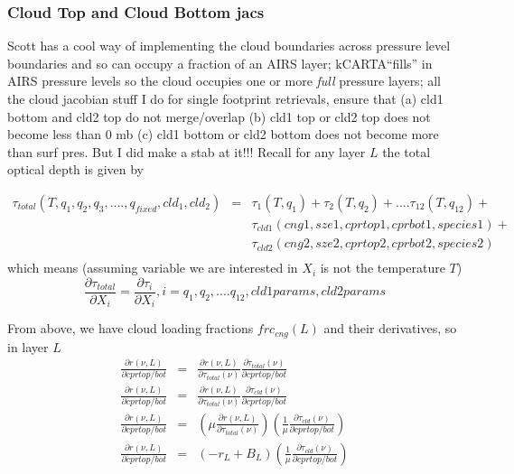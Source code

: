 \documentclass[11pt]{article}
\newcommand{\kc}{\textsf{kCARTA}\xspace}
\begin{document}
\subsubsection{Cloud Top and Cloud Bottom jacs}

Scott has a cool way of implementing the cloud
boundaries across pressure level boundaries and so can occupy a
fraction of an AIRS layer; \kc ``fills'' in AIRS pressure levels so
the cloud occupies one or more \textit{full} pressure layers; all the
cloud jacobian stuff I do for single footprint retrievals, ensure that
(a) cld1 bottom and cld2 top do not merge/overlap (b) cld1 top or cld2 top
does not become less than 0 mb (c) cld1 bottom or cld2 bottom does not
become more than surf pres. But I did make a stab at it!!! Recall for any layer $L$ the total optical depth is given by 

\begin{eqnarray*}
\tau_{total}(T,q_1,q_2,q_3,....,q_{fixed},cld_1,cld_2) & = & \tau_1(T,q_1) + \tau_2(T,q_2) + .... \tau_{12}(T,q_{12}) + \\
                                                       &   & \tau_{cld1}(cng1,sze1,cprtop1,cprbot1,species1) + \\
                                                       &   & \tau_{cld2}(cng2,sze2,cprtop2,cprbot2,species2) \\
\end{eqnarray*}
which means (assuming variable we are interested in $X_i$ is not the temperature $T$)
\[ 
\frac{\partial \tau_{total}}{\partial X_i} = \frac{\partial \tau_{i}}{\partial X_i}, i=q_1,q_2,....q_{12},cld1 params, cld2 params
\]

From above, we have cloud loading fractions $frc_{cng}(L)$ and their derivatives, so in layer $L$
\begin{eqnarray*}
\frac{\partial r(\nu,L)}{\partial cprtop/bot}  & = &  \frac{\partial r(\nu,L)}{\partial \tau_{total}(\nu)} \frac{\partial \tau_{total}(\nu)}{\partial cprtop/bot} \\
\frac{\partial r(\nu,L)}{\partial cprtop/bot}  & = &  \frac{\partial r(\nu,L)}{\partial \tau_{total}(\nu)} \frac{\partial \tau_{cld}(\nu)}{\partial cprtop/bot} \\
\frac{\partial r(\nu,L)}{\partial cprtop/bot}  & = &  \left( \mu \frac{\partial r(\nu,L)}{\partial \tau_{total}(\nu)} \right) \left( \frac{1}{\mu} \frac{\partial \tau_{cld}(\nu)}{\partial cprtop/bot} \right) \\
\frac{\partial r(\nu,L)}{\partial cprtop/bot}  & = &  \left( -r_L + B_L \right) \left( \frac{1}{\mu} \frac{\partial \tau_{cld}(\nu)}{\partial cprtop/bot} \right) \\
\end{eqnarray*}
\end{document}
